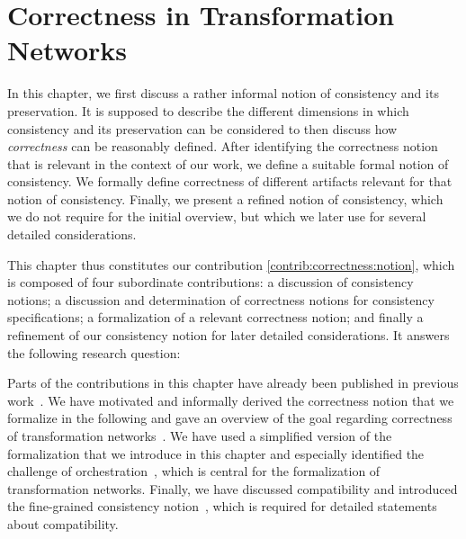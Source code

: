 \chapter{Correctness in Transformation Networks
}
\label{chap:correctness}

In this chapter, we first discuss a rather informal notion of consistency and its preservation. It is supposed to describe the different dimensions in which consistency and its preservation can be considered to then discuss how \emph{correctness} can be reasonably defined.
After identifying the correctness notion that is relevant in the context of our work, we define a suitable formal notion of consistency.
We formally define correctness of different artifacts relevant for that notion of consistency.
Finally, we present a refined notion of consistency, which we do not require for the initial overview, but which we later use for several detailed considerations.

This chapter thus constitutes our contribution \autoref{contrib:correctness:notion}, which is composed of four subordinate contributions: a discussion of consistency notions; a discussion and determination of correctness notions for consistency specifications; a formalization of a relevant correctness notion; and finally a refinement of our consistency notion for later detailed considerations.
It answers the following research question:


Parts of the contributions in this chapter have already been published in previous work~.
We have motivated and informally derived the correctness notion that we formalize in the following and gave an overview of the goal regarding correctness of transformation networks~.
We have used a simplified version of the formalization that we introduce in this chapter and especially identified the challenge of orchestration~, which is central for the formalization of transformation networks.
Finally, we have discussed compatibility and introduced the fine-grained consistency notion~, which is required for detailed statements about compatibility.






